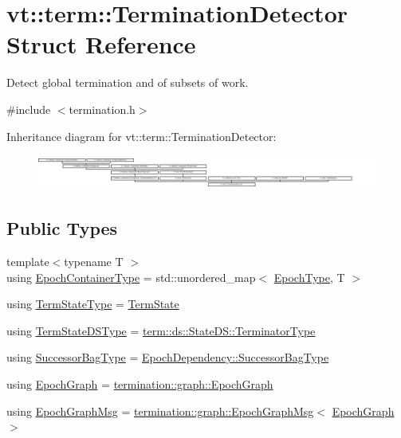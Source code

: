 \hypertarget{structvt_1_1term_1_1_termination_detector}{}\section{vt\+:\+:term\+:\+:Termination\+Detector Struct Reference}
\label{structvt_1_1term_1_1_termination_detector}


Detect global termination and of subsets of work.  




{\ttfamily \#include $<$termination.\+h$>$}

Inheritance diagram for vt\+:\+:term\+:\+:Termination\+Detector\+:\begin{figure}[H]
\begin{center}
\leavevmode
\includegraphics[height=1.142857cm]{structvt_1_1term_1_1_termination_detector}
\end{center}
\end{figure}
\subsection*{Public Types}
\begin{DoxyCompactItemize}
\item 
{\footnotesize template$<$typename T $>$ }\\using \hyperlink{structvt_1_1term_1_1_termination_detector_a69e2615b61e072977463eea5b20b7933}{Epoch\+Container\+Type} = std\+::unordered\+\_\+map$<$ \hyperlink{namespacevt_a985a5adf291c34a3ca263b3378388236}{Epoch\+Type}, T $>$
\item 
using \hyperlink{structvt_1_1term_1_1_termination_detector_a0a47413bcb7bf5e10ecb31e7871a9268}{Term\+State\+Type} = \hyperlink{structvt_1_1term_1_1_term_state}{Term\+State}
\item 
using \hyperlink{structvt_1_1term_1_1_termination_detector_aa96c37b5c120063060c6418c48e64bd1}{Term\+State\+D\+S\+Type} = \hyperlink{structvt_1_1term_1_1ds_1_1_state_d_s_af98cfe31c25f710273ee103026d538e4}{term\+::ds\+::\+State\+D\+S\+::\+Terminator\+Type}
\item 
using \hyperlink{structvt_1_1term_1_1_termination_detector_ac8df9c8a604ee2073ce195a994aaf252}{Successor\+Bag\+Type} = \hyperlink{structvt_1_1term_1_1_epoch_dependency_a3f00b47c33158f3241ebbeb0a0cb7b1d}{Epoch\+Dependency\+::\+Successor\+Bag\+Type}
\item 
using \hyperlink{structvt_1_1term_1_1_termination_detector_af67f0ab522e54eb06d8ac541526155e3}{Epoch\+Graph} = \hyperlink{structvt_1_1termination_1_1graph_1_1_epoch_graph}{termination\+::graph\+::\+Epoch\+Graph}
\item 
using \hyperlink{structvt_1_1term_1_1_termination_detector_aec8abc5a3b161ac7df73ff3ba385dace}{Epoch\+Graph\+Msg} = \hyperlink{structvt_1_1termination_1_1graph_1_1_epoch_graph_msg}{termination\+::graph\+::\+Epoch\+Graph\+Msg}$<$ \hyperlink{structvt_1_1term_1_1_termination_detector_af67f0ab522e54eb06d8ac541526155e3}{Epoch\+Graph} $>$
\end{DoxyCompactItemize}

